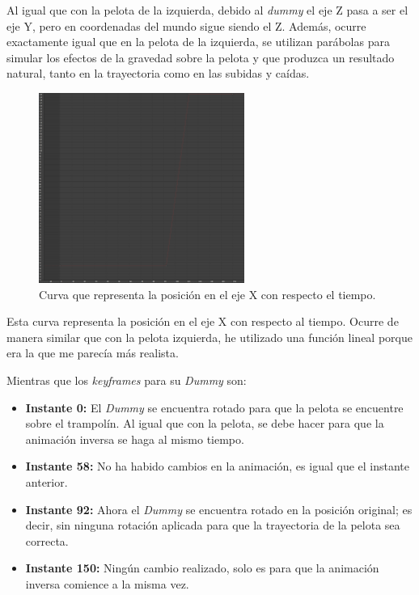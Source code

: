 \documentclass{article}
\begin{document}
 Al igual que con la pelota de la izquierda, debido al \textit{dummy} el eje Z pasa a ser el eje Y, pero en coordenadas del mundo sigue siendo el Z. Además, ocurre exactamente igual que en la pelota de la izquierda, se utilizan parábolas para simular los efectos de la gravedad sobre la pelota y que produzca un resultado natural, tanto en la trayectoria como en las subidas y caídas.

 \begin{figure}[H]
    \centering
    \includegraphics[width=0.6\textwidth]{imagenes/curvas/PR/pelota/red.png}
    \caption{Curva que representa la posición en el eje X con respecto el tiempo.}
 \end{figure}

Esta curva representa la posición en el eje X con respecto al tiempo. Ocurre de manera similar que con la pelota izquierda, he utilizado una función lineal porque era la que me parecía más realista.


Mientras que los \textit{keyframes} para su \textit{Dummy} son:

\begin{itemize}
    \item \textbf{Instante 0: }El \textit{Dummy} se encuentra rotado para que la pelota se encuentre sobre el trampolín. Al igual que con la pelota, se debe hacer para que la animación inversa se haga al mismo tiempo.
    \item \textbf{Instante 58: }No ha habido cambios en la animación, es igual que el instante anterior.
    \item \textbf{Instante 92: }Ahora el \textit{Dummy} se encuentra rotado en la posición original; es decir, sin ninguna rotación aplicada para que la trayectoria de la pelota sea correcta.
    \item \textbf{Instante 150: }Ningún cambio realizado, solo es para que la animación inversa comience a la misma vez.
\end{itemize}
\end{document}

